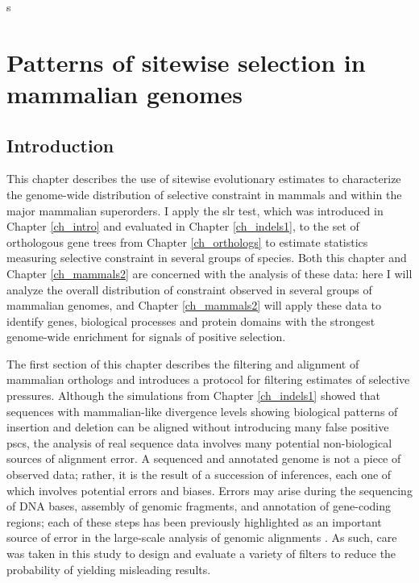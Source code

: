 s%
\chapter{Patterns of sitewise selection in mammalian genomes}
\label{ch_mammals1}
\acresetall

\section{Introduction}

This chapter describes the use of sitewise evolutionary estimates to
characterize the genome-wide distribution of selective constraint in
mammals and within the major mammalian superorders. I apply the
\ac{slr} test, which was introduced in Chapter \ref{ch_intro} and
evaluated in Chapter \ref{ch_indels1}, to the set of orthologous gene
trees from Chapter \ref{ch_orthologs} to estimate statistics measuring
\sw selective constraint in several groups of \mammln species. Both
this chapter and Chapter \ref{ch_mammals2} are concerned with the
analysis of these \sw data: here I will analyze the overall
distribution of constraint observed in several groups of mammalian
genomes, and Chapter \ref{ch_mammals2} will apply these \sw data to
identify genes, biological processes and protein domains with the
strongest genome-wide enrichment for signals of positive selection.

The first section of this chapter describes the filtering and
alignment of mammalian orthologs and introduces a protocol for
filtering \sw estimates of selective pressures. Although the
simulations from Chapter \ref{ch_indels1} showed that sequences with
mammalian-like divergence levels showing biological patterns of
insertion and deletion can be aligned without introducing many false
positive \acp{psc}, the analysis of real sequence data involves many
potential non-biological sources of alignment error. A sequenced and
annotated genome is not a piece of observed data; rather, it is the
result of a succession of inferences, each one of which involves
potential errors and biases. Errors may arise during the sequencing of
DNA bases, assembly of genomic fragments, and annotation of
gene-coding regions; each of these steps has been previously
highlighted as an important source of error in the large-scale
analysis of genomic alignments
\citep{Schneider2009,Mallick2009,Milinkovitch2010,Hubisz2011}. As
such, care was taken in this study to design and evaluate a variety of
filters to reduce the probability of yielding misleading results.

